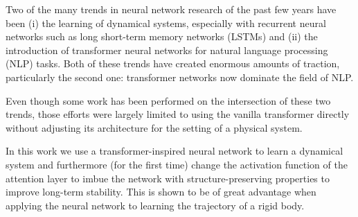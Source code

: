 Two of the many trends in neural network research of the past few years have been (i) the learning of dynamical systems, especially with recurrent neural networks such as long short-term memory networks (LSTMs) and (ii) the introduction of transformer neural networks for natural language processing (NLP) tasks. Both of these trends have created enormous amounts of traction, particularly the second one: transformer networks now dominate the field of NLP. 

Even though some work has been performed on the intersection of these two trends, those efforts were largely limited to using the vanilla transformer directly without adjusting its architecture for the setting of a physical system.

In this work we use a transformer-inspired neural network to learn a dynamical system and furthermore (for the first time) change the activation function of the attention layer to imbue the network with structure-preserving properties to improve long-term stability. This is shown to be of great advantage when applying the neural network to learning the trajectory of a rigid body.